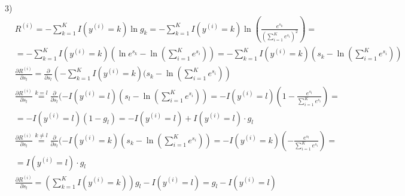 \documentclass{report}
\begin{document}
\par 3)
\begin{align*}
& R^{(i)} = - \sum_{k=1}^{K} I(y^{(i)} = k) \ln g_k = - \sum_{k=1}^{K} I(y^{(i)} = k) \ln \left( \frac{e^{s_k}}{(\sum_{i=1}^{K} e^{s_i})^2} \right) = \\
& = - \sum_{k=1}^{K} I(y^{(i)} = k) (\ln e^{s_k} - \ln (\sum_{i=1}^{K} e^{s_i})) = - \sum_{k=1}^{K} I(y^{(i)} = k) (s_k - \ln (\sum_{i=1}^{K} e^{s_i})) \\
& \frac{\partial R^{(i)}}{\partial s_l} = \frac{\partial}{\partial s_l} \left( - \sum_{k=1}^{K} I(y^{(i)} = k)(s_k - \ln (\sum_{i=1}^{K} e^{s_i}) \right) \\
& \frac{\partial R^{(i)}}{\partial s_l} \overset{k = l}{=} \frac{\partial}{\partial s_l} (-I(y^{(i)} = l)(s_l - \ln (\sum_{i=1}^{K} e^{s_i})) = -I(y^{(i)} = l) \left( 1 - \frac{e^{s_l}}{\sum_{i=1}^{K} e^{s_i}} \right) = \\
& = -I(y^{(i)} = l)(1 - g_l) = -I(y^{(i)} = l) + I(y^{(i)} = l) \cdot g_l \\
& \frac{\partial R^{(i)}}{\partial s_l} \overset{k \neq l}{=} \frac{\partial}{\partial s_l} (-I(y^{(i)} = k)(s_k - \ln (\sum_{i=1}^{K} e^{s_i})) = -I(y^{(i)} = k) \left( - \frac{e^{s_l}}{\sum_{i=1}^{K} e^{s_i}} \right) = \\
& = I(y^{(i)} = l) \cdot g_l \\
& \frac{\partial R^{(i)}}{\partial s_l} = \left( \sum_{k=1}^{K} I(y^{(i)} = k) \right) g_l - I(y^{(i)} = l) = g_l - I(y^{(i)} = l)
\end{align*}
\end{document}
